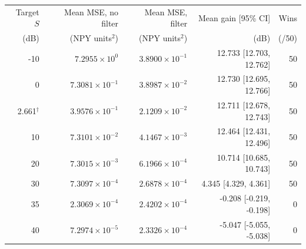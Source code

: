 \begin{tabular}{rrrrr}
\toprule
Target $S$ & Mean MSE, no filter & Mean MSE, filter & Mean gain [95\% CI] & Wins \\
(dB) & (NPY units$^2$) & (NPY units$^2$) & (dB) & (/50) \\
\midrule
-10 & $7.2955\times10^{0}$ & $3.8900\times10^{-1}$ & 12.733 [12.703, 12.762] & 50 \\
0 & $7.3081\times10^{-1}$ & $3.8987\times10^{-2}$ & 12.730 [12.695, 12.766] & 50 \\
2.661$^\dagger$ & $3.9576\times10^{-1}$ & $2.1209\times10^{-2}$ & 12.711 [12.678, 12.743] & 50 \\
10 & $7.3101\times10^{-2}$ & $4.1467\times10^{-3}$ & 12.464 [12.431, 12.496] & 50 \\
20 & $7.3015\times10^{-3}$ & $6.1966\times10^{-4}$ & 10.714 [10.685, 10.743] & 50 \\
30 & $7.3097\times10^{-4}$ & $2.6878\times10^{-4}$ & 4.345 [4.329, 4.361] & 50 \\
35 & $2.3069\times10^{-4}$ & $2.4202\times10^{-4}$ & -0.208 [-0.219, -0.198] & 0 \\
40 & $7.2974\times10^{-5}$ & $2.3326\times10^{-4}$ & -5.047 [-5.055, -5.038] & 0 \\
\bottomrule
\end{tabular}
